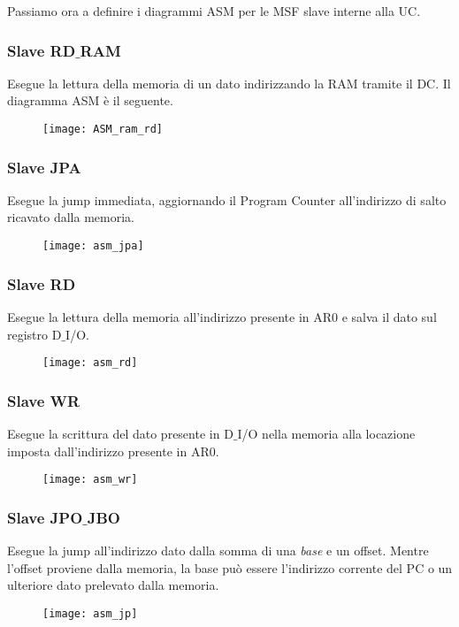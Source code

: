 \par \bigskip \noindent
Passiamo ora a definire i diagrammi ASM per le MSF slave interne alla UC.
\subsubsection{Slave RD$\_$RAM}
Esegue la lettura della memoria di un dato indirizzando la RAM tramite il DC. Il diagramma ASM è il seguente.
\begin{figure}[H]
	\centering
	\texttt{[image: ASM\_ram\_rd]}
	\label{fig:asm_ram_rd}
\end{figure}

\newpage
\subsubsection{Slave JPA}
Esegue la jump immediata, aggiornando il Program Counter all'indirizzo di salto ricavato dalla memoria.
\begin{figure}[H]
	\centering
	\texttt{[image: asm\_jpa]}
	\label{fig:asm_jpa}
\end{figure}

\newpage
\subsubsection{Slave RD}
Esegue la lettura della memoria all'indirizzo presente in AR0 e salva il dato sul registro D$\_$I/O.
\begin{figure}[H]
	\centering
	\texttt{[image: asm\_rd]}
	\label{fig:asm_rd}
\end{figure}

\newpage
\subsubsection{Slave WR}
Esegue la scrittura del dato presente in D$\_$I/O nella memoria alla locazione imposta dall'indirizzo presente in AR0.
\begin{figure}[H]
\centering
\texttt{[image: asm\_wr]}
\label{fig:asm_wr}
\end{figure}

\newpage
\subsubsection{Slave JPO$\_$JBO}
Esegue la jump all'indirizzo dato dalla somma di una \textit{base} e un offset. Mentre l'offset proviene dalla memoria, la base può essere l'indirizzo corrente del PC o un ulteriore dato prelevato dalla memoria.
\begin{figure}[H]
	\centering
	\texttt{[image: asm\_jp]}
	\label{fig:asm_jp}
\end{figure}

